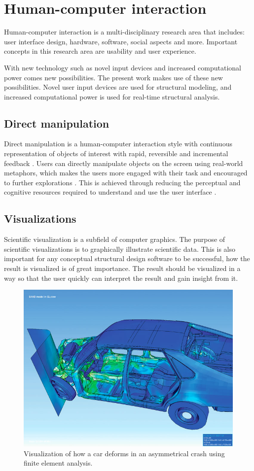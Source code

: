 \chapter{Human-computer interaction}
\label{ch:Human-computer interaction}
Human-computer interaction is a multi-disciplinary research area that includes: user interface design, hardware, software, social aspects and more. Important concepts in this research area are usability and user experience.

With new technology such as novel input devices and increased computational power comes new possibilities. The present work makes use of these new possibilities. Novel user input devices are used for structural modeling, and increased computational power is used for real-time structural analysis. 

\section{Direct manipulation}
Direct manipulation is a human-computer interaction style with continuous representation of objects of interest with rapid, reversible and incremental feedback \cite{Shneiderman1982}. Users can directly manipulate objects on the screen using real-world metaphors, which makes the users more engaged with their task and encouraged to further explorations \cite{Shneiderman:1997:DMC:238218.238281}. This is achieved through reducing the perceptual and cognitive resources required to understand and use the user interface \cite{Sears1990}.

\section{Visualizations}
Scientific visualization is a subfield of computer graphics. The purpose of scientific visualizations is to graphically illustrate scientific data. This is also important for any conceptual structural design software to be successful, how the result is visualized is of great importance. The result should be visualized in a way so that the user quickly can interpret the result and gain insight from it. 

\begin{figure}
  \includegraphics[width=320pt]{graphics/car.jpg}
  \caption{Visualization of how a car deforms in an asymmetrical crash using finite element analysis.}
  \label{fig:Car}
\end{figure}

